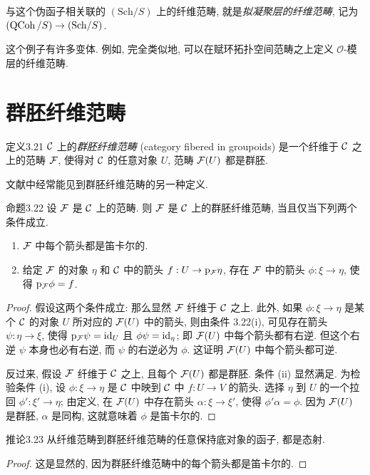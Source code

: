与这个伪函子相关联的 $(\mathrm{Sch}/S)$ 上的纤维范畴, 就是\emph{拟凝聚层的纤维范畴}, 记为 $(\operatorname{QCoh}/S)\to(\mathrm{Sch}/S)$.

这个例子有许多变体. 例如, 完全类似地, 可以在赋环拓扑空间范畴之上定义 $\mathcal O$-模层的纤维范畴.

\section{群胚纤维范畴}
\label{ch03:sec33}
\begin{origstatement}{定义}{3.21}\label{ch03:def321}
$\mathcal C$ 上的\emph{群胚纤维范畴} (category fibered in groupoids) 是一个纤维于 $\mathcal C$ 之上的范畴 $\mathcal F$, 使得对 $\mathcal C$ 的任意对象 $U$, 范畴 $\mathcal F(U)$ 都是群胚.
\end{origstatement}

文献中经常能见到群胚纤维范畴的另一种定义.

\begin{origstatement}{命题}{3.22}\label{ch03:prop322}
设 $\mathcal F$ 是 $\mathcal C$ 上的范畴. 则 $\mathcal F$ 是 $\mathcal C$ 上的群胚纤维范畴, 当且仅当下列两个条件成立.
\begin{enumerate}
\item[(i)] $\mathcal F$ 中每个箭头都是笛卡尔的.
\item[(ii)] 给定 $\mathcal F$ 的对象 $\eta$ 和 $\mathcal C$ 中的箭头 $f:U\to\mathrm p_{\mathcal F}\eta$, 存在 $\mathcal F$ 中的箭头 $\phi:\xi\to\eta$, 使得 $\mathrm p_{\mathcal F}\phi=f$.
\end{enumerate}
\end{origstatement}
\begin{proof}
假设这两个条件成立: 那么显然 $\mathcal F$ 纤维于 $\mathcal C$ 之上. 此外, 如果 $\phi:\xi\to\eta$ 是某个 $\mathcal C$ 的对象 $U$ 所对应的 $\mathcal F(U)$ 中的箭头, 则由条件 3.22(i), 可见存在箭头 $\psi:\eta\to\xi$, 使得 $\mathrm p_{\mathcal F}\psi=\mathrm{id}_U$ 且 $\phi\psi=\mathrm{id}_\eta$; 即 $\mathcal F(U)$ 中每个箭头都有右逆. 但这个右逆 $\psi$ 本身也必有右逆, 而 $\psi$ 的右逆必为 $\phi$. 这证明 $\mathcal F(U)$ 中每个箭头都可逆.

反过来, 假设 $\mathcal F$ 纤维于 $\mathcal C$ 之上, 且每个 $\mathcal F(U)$ 都是群胚. 条件 (ii) 显然满足. 为检验条件 (i), 设 $\phi:\xi\to\eta$ 是 $\mathcal C$ 中映到 $\mathcal C$ 中 $f:U\to V$ 的箭头. 选择 $\eta$ 到 $U$ 的一个拉回 $\phi':\xi'\to\eta$; 由定义, 在 $\mathcal F(U)$ 中存在箭头 $\alpha:\xi\to\xi'$, 使得 $\phi'\alpha=\phi$. 因为 $\mathcal F(U)$ 是群胚, $\alpha$ 是同构, 这就意味着 $\phi$ 是笛卡尔的.
\end{proof}

\begin{origstatement}{推论}{3.23}\label{ch03:cor323}
从纤维范畴到群胚纤维范畴的任意保持底对象的函子, 都是态射.
\end{origstatement}
\begin{proof}
这是显然的, 因为群胚纤维范畴中的每个箭头都是笛卡尔的.
\end{proof}

